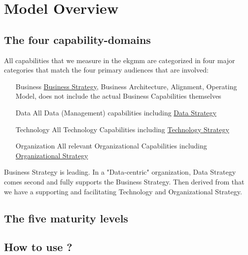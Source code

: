\section{Model Overview}\label{sec:model-overview}

\subsection{The four capability-domains}\label{subsec:the-four-capability-domains}

All capabilities that we measure in the \acrshort{ekgmm} are categorized in four major categories that match the four primary audiences that are involved:

\begin{enumerate}[leftmargin=1in,font=\bfseries]
    \item [Business]     \ul{Business Strategy}, Business Architecture, Alignment, Operating Model, does not include the actual Business Capabilities themselves
    \item [Data]         All Data (Management) capabilities including \ul{Data Strategy}
    \item [Technology]   All Technology Capabilities including \ul{Technology Strategy}
    \item [Organization] All relevant Organizational Capabilities including \ul{Organizational Strategy}
\end{enumerate}

Business Strategy is leading.
In a "Data-centric" organization, Data Strategy comes second and fully supports the Business Strategy.
Then derived from that we have a supporting and facilitating Technology and Organizational Strategy.

\subsection{The five maturity levels}\label{subsec:the-five-maturity-levels}





\subsection{How to use ?}





